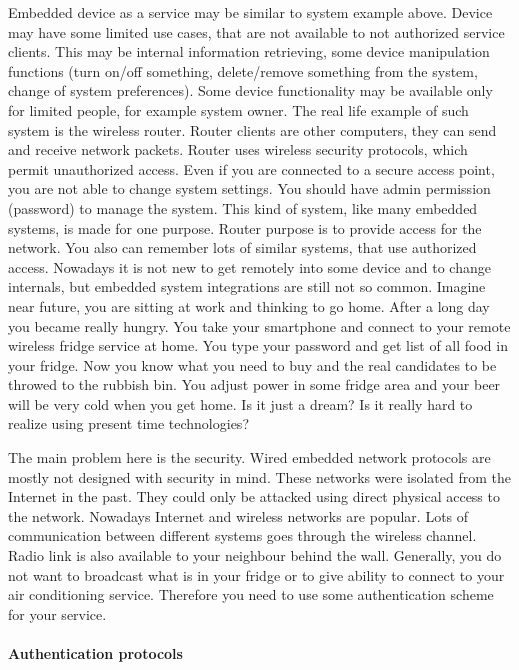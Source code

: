 Embedded device as a service may be similar to system example above. Device may
have some limited use cases, that are not available to not authorized service
clients. This may be internal information retrieving, some  device
manipulation functions (turn on/off something, delete/remove something from the
system, change of system preferences). Some device functionality may be
available only for limited people, for example system owner. The real life example of such system is the wireless
router. Router clients are other computers, they can send and receive network
packets. Router uses wireless security protocols, which permit unauthorized
access. Even if you are connected to a secure access point, you are not able to
change system settings. You should have admin permission (password) to manage
the system. This kind of system, like many embedded systems, is made for one
purpose. Router purpose is to provide access for the network. You also can
remember lots of similar systems, that use authorized access. Nowadays it is not new to get
remotely into some device and to change internals, but embedded system
integrations are still not so common. Imagine near future, you are sitting at
work and thinking to go home. After a long day you became really hungry. You
take your smartphone and connect to your remote wireless fridge service at home. You type
your password and get list of all food in your fridge. Now you know what you
need to buy and the real candidates to be throwed to the rubbish bin. You adjust
power in some fridge area and your beer will be very cold when you get home. Is
it just a dream? Is it really hard to realize using present time technologies?


The main problem here is the security. Wired embedded network protocols are
mostly not designed with security in mind. These networks were isolated from the
Internet in the past. They could only be attacked using direct physical access
to the network. Nowadays Internet and wireless networks are popular. Lots of
communication between different systems goes through the wireless channel. Radio link is also available to your neighbour behind the wall. Generally, you do not want to broadcast what is in your fridge or to give ability to connect to your air conditioning service. Therefore you need to use some authentication scheme for
your service.

\paragraph{Authentication protocols}

